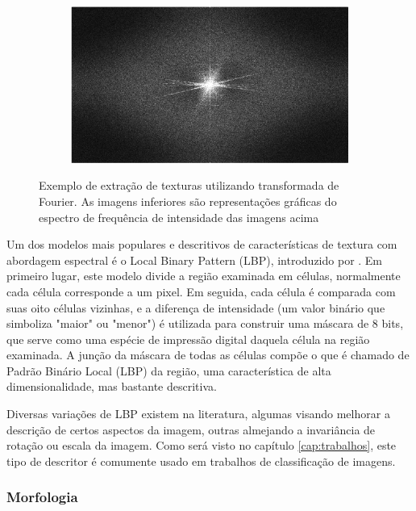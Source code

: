 \begin{figure}[h]
\begin{subfigure}[b]{0.45\textwidth}
  \end{subfigure}%
  ~
  \begin{subfigure}[b]{0.45\textwidth}
    \includegraphics[width=\textwidth]{imgs/stab_2_spectra}
  \end{subfigure}%
  \caption[Exemplo de extração de texturas utilizando transformada de Fourier]{Exemplo de extração de texturas utilizando transformada de Fourier. As imagens inferiores são representações gráficas do espectro de frequência de intensidade das imagens acima}
  \label{fig:textura_fourier}
\end{figure}

Um dos modelos mais populares e descritivos de características de textura com abordagem espectral é o Local Binary Pattern (LBP), introduzido por . Em primeiro lugar, este modelo divide a região examinada em células, normalmente cada célula corresponde a um pixel. Em seguida, cada célula é comparada com suas oito células vizinhas, e a diferença de intensidade (um valor binário que simboliza "maior" ou "menor") é utilizada para construir uma máscara de 8 bits, que serve como uma espécie de impressão digital daquela célula na região examinada. A junção da máscara de todas as células compõe o que é chamado de Padrão Binário Local (LBP) da região, uma característica de alta dimensionalidade, mas bastante descritiva.

Diversas variações de LBP existem na literatura, algumas visando melhorar a descrição de certos aspectos da imagem, outras almejando a invariância de rotação ou escala da imagem. Como será visto no capítulo \ref{cap:trabalhos}, este tipo de descritor é comumente usado em trabalhos de classificação de imagens.

\subsubsection*{Morfologia}

